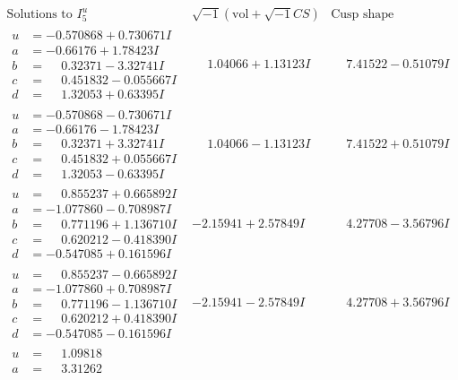 \documentclass[1p]{elsarticle_modified}
\theoremstyle{definition}
\newcommand{\I}{\sqrt{-1}}
\begin{document}
$$\begin{array}{c|c|c}  
\text{Solutions to }I^u_{5}& \I (\text{vol} + \sqrt{-1}CS) & \text{Cusp shape}\\
 \hline 
\begin{aligned}
u &= -0.570868 + 0.730671 I \\
a &= -0.66176 + 1.78423 I \\
b &= \phantom{-}0.32371 - 3.32741 I \\
c &= \phantom{-}0.451832 - 0.055667 I \\
d &= \phantom{-}1.32053 + 0.63395 I\end{aligned}
 & \phantom{-}1.04066 + 1.13123 I & \phantom{-}7.41522 - 0.51079 I \\ \hline\begin{aligned}
u &= -0.570868 - 0.730671 I \\
a &= -0.66176 - 1.78423 I \\
b &= \phantom{-}0.32371 + 3.32741 I \\
c &= \phantom{-}0.451832 + 0.055667 I \\
d &= \phantom{-}1.32053 - 0.63395 I\end{aligned}
 & \phantom{-}1.04066 - 1.13123 I & \phantom{-}7.41522 + 0.51079 I \\ \hline\begin{aligned}
u &= \phantom{-}0.855237 + 0.665892 I \\
a &= -1.077860 - 0.708987 I \\
b &= \phantom{-}0.771196 + 1.136710 I \\
c &= \phantom{-}0.620212 - 0.418390 I \\
d &= -0.547085 + 0.161596 I\end{aligned}
 & -2.15941 + 2.57849 I & \phantom{-}4.27708 - 3.56796 I \\ \hline\begin{aligned}
u &= \phantom{-}0.855237 - 0.665892 I \\
a &= -1.077860 + 0.708987 I \\
b &= \phantom{-}0.771196 - 1.136710 I \\
c &= \phantom{-}0.620212 + 0.418390 I \\
d &= -0.547085 - 0.161596 I\end{aligned}
 & -2.15941 - 2.57849 I & \phantom{-}4.27708 + 3.56796 I \\ \hline\begin{aligned}
u &= \phantom{-}1.09818\phantom{ +0.000000I} \\
a &= \phantom{-}3.31262\phantom{ +0.000000I} \\

\end{aligned}
\end{array}$$
\end{document}

